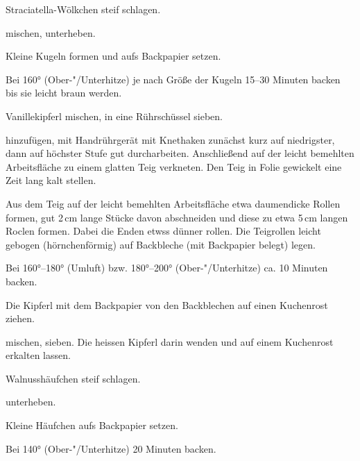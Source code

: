 \begin{recipe}{Straciatella-Wölkchen}
  steif schlagen.

  mischen, unterheben.

  
  Kleine Kugeln formen und aufs Backpapier setzen.

  Bei 160° (Ober-"/Unterhitze) je nach Größe der Kugeln 15--30 Minuten
  backen bis sie leicht braun werden.
\end{recipe}



\begin{recipe}{Vanillekipferl}
  mischen, in eine Rührschüssel sieben.
  
  hinzufügen, mit Handrührgerät mit Knethaken zunächst kurz auf
  niedrigster, dann auf höchster Stufe gut durcharbeiten.
  Anschließend auf der leicht bemehlten Arbeitsfläche zu einem glatten
  Teig verkneten. Den Teig in Folie gewickelt eine Zeit lang kalt
  stellen.

  Aus dem Teig auf der leicht bemehlten Arbeitsfläche etwa daumendicke
  Rollen formen, gut 2\,cm lange Stücke davon abschneiden und diese zu
  etwa 5\,cm langen Roclen formen. Dabei die Enden etwss dünner rollen.
  Die Teigrollen leicht gebogen (hörnchenförmig) auf Backbleche (mit
  Backpapier belegt) legen.

  Bei 160°--180° (Umluft) bzw. 180°--200° (Ober-"/Unterhitze) ca. 10 Minuten backen.

  Die Kipferl mit dem Backpapier von den Backblechen auf einen
  Kuchenrost ziehen.
  
  mischen, sieben. Die heissen Kipferl darin wenden und auf einem
  Kuchenrost erkalten lassen.
\end{recipe}



\begin{recipe}{Walnusshäufchen}
  steif schlagen.

  unterheben.

  Kleine Häufchen aufs Backpapier setzen.

  Bei 140° (Ober-"/Unterhitze) 20 Minuten backen.
\end{recipe}



